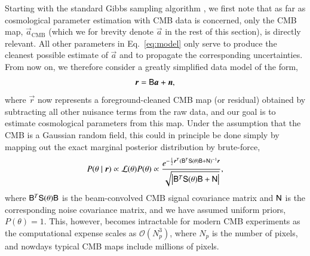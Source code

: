 \documentclass[twocolumn]{aa}
\newcommand{\B}[0]{\tens{B}}
\newcommand{\n}[0]{\vec{n}}
\renewcommand{\a}[0]{\vec{a}}
\newcommand{\N}[0]{\tens{N}}
\renewcommand{\S}[0]{\tens{S}}
\renewcommand{\r}[0]{\vec{r}}
\begin{document}
Starting with the standard Gibbs sampling algorithm \citep{jewell2004,wandelt2004}, we first note that as far as cosmological parameter estimation with CMB data is concerned, only the CMB map, $\a_{\mathrm{CMB}}$ (which we for brevity denote $\a$ in the rest of this section), is directly relevant. All other parameters in Eq.~\eqref{eq:model} only serve to produce the cleanest possible estimate of $\a$ and to propagate the corresponding uncertainties. From now on, we therefore consider a greatly simplified data model of the form,
\begin{equation}
  \r = \B\a + \n,
\end{equation}
where $\r$ now represents a foreground-cleaned CMB map (or residual) obtained by subtracting all other nuisance terms from the raw data, and our goal is to estimate cosmological parameters from this map. Under the assumption that the CMB is a Gaussian random field, this could in principle be done simply by mapping out the exact marginal posterior distribution by brute-force,
\begin{equation}
  P(\theta \mid \r) \propto \mathcal{L}(\theta)P(\theta) \propto \frac{e^{-\frac12 \r^T (\B^T \S(\theta) \B + \N)^{-1}\r}}{\sqrt{\left|\B^T \S(\theta) \B + \N\right|}},
  \label{eq:exact_posterior}
\end{equation}
where $\B^T \S(\theta) \B$ is the beam-convolved CMB signal covariance matrix and $\N$ is the corresponding noise covariance matrix, and we have assumed uniform priors, $P(\theta) = 1$. This, however, becomes intractable for modern CMB experiments as the computational expense scales as $\mathcal{O}(N_p^3)$, where $N_p$ is the number of pixels, and nowdays typical CMB maps include millions of pixels.
\end{document}
